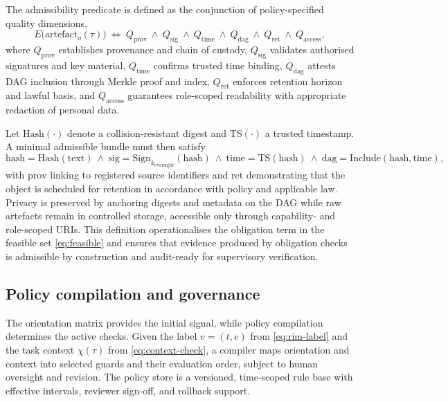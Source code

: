 \documentclass[oneside,10pt]{swissi}
\begin{document}
The admissibility predicate is defined as the conjunction of policy-specified quality dimensions,
\begin{equation}
E\bigl(\mathrm{artefact}_o(\tau)\bigr)\ \Leftrightarrow\ Q_{\mathrm{prov}}\ \wedge\ Q_{\mathrm{sig}}\ \wedge\ Q_{\mathrm{time}}\ \wedge\ Q_{\mathrm{dag}}\ \wedge\ Q_{\mathrm{ret}}\ \wedge\ Q_{\mathrm{access}},
\label{eq:evidence}
\end{equation}
where \(Q_{\mathrm{prov}}\) establishes provenance and chain of custody, \(Q_{\mathrm{sig}}\) validates authorised signatures and key material, \(Q_{\mathrm{time}}\) confirms trusted time binding, \(Q_{\mathrm{dag}}\) attests DAG inclusion through Merkle proof and index, \(Q_{\mathrm{ret}}\) enforces retention horizon and lawful basis, and \(Q_{\mathrm{access}}\) guarantees role-scoped readability with appropriate redaction of personal data.

Let \(\mathrm{Hash}(\cdot)\) denote a collision-resistant digest and \(\mathrm{TS}(\cdot)\) a trusted timestamp. A minimal admissible bundle must then satisfy
\begin{equation}
\text{hash}=\mathrm{Hash}(\text{text})\ \wedge\ \text{sig}=\mathrm{Sign}_{k_{\mathrm{oversight}}}(\text{hash})\ \wedge\ \text{time}=\mathrm{TS}(\text{hash})\ \wedge\ \text{dag}=\mathrm{Include}(\text{hash},\text{time}),
\label{eq:min-bundle}
\end{equation}
with \(\text{prov}\) linking to registered source identifiers and \(\text{ret}\) demonstrating that the object is scheduled for retention in accordance with policy and applicable law. Privacy is preserved by anchoring digests and metadata on the DAG while raw artefacts remain in controlled storage, accessible only through capability- and role-scoped URIs. This definition operationalises the obligation term in the feasible set \eqref{eq:feasible} and ensures that evidence produced by obligation checks is admissible by construction and audit-ready for supervisory verification.\\

\subsection{Policy compilation and governance}

The orientation matrix provides the initial signal, while policy compilation determines the active checks. Given the label \(v=(t,e)\) from \eqref{eq:rim-label} and the task context \(\chi(\tau)\) from \eqref{eq:context-check}, a compiler maps orientation and context into selected guards and their evaluation order, subject to human oversight and revision. The policy store is a versioned, time-scoped rule base with effective intervals, reviewer sign-off, and rollback support.
\end{document}
